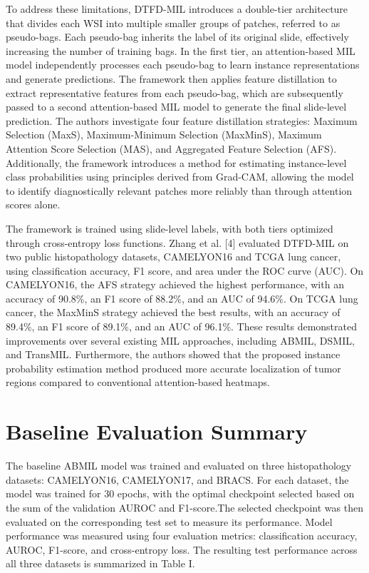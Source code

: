\documentclass[journal]{IEEEtran}
\begin{document}
To address these limitations, DTFD-MIL introduces a double-tier architecture that divides each WSI into multiple smaller groups of patches, referred to as pseudo-bags. Each pseudo-bag inherits the label of its original slide, effectively increasing the number of training bags. In the first tier, an attention-based MIL model independently processes each pseudo-bag to learn instance representations and generate predictions. The framework then applies feature distillation to extract representative features from each pseudo-bag, which are subsequently passed to a second attention-based MIL model to generate the final slide-level prediction. The authors investigate four feature distillation strategies: Maximum Selection (MaxS), Maximum-Minimum Selection (MaxMinS), Maximum Attention Score Selection (MAS), and Aggregated Feature Selection (AFS). Additionally, the framework introduces a method for estimating instance-level class probabilities using principles derived from Grad-CAM, allowing the model to identify diagnostically relevant patches more reliably than through attention scores alone.

The framework is trained using slide-level labels, with both tiers optimized through cross-entropy loss functions. Zhang et al. [4] evaluated DTFD-MIL on two public histopathology datasets, CAMELYON16 and TCGA lung cancer, using classification accuracy, F1 score, and area under the ROC curve (AUC). On CAMELYON16, the AFS strategy achieved the highest performance, with an accuracy of 90.8\%, an F1 score of 88.2\%, and an AUC of 94.6\%. On TCGA lung cancer, the MaxMinS strategy achieved the best results, with an accuracy of 89.4\%, an F1 score of 89.1\%, and an AUC of 96.1\%. These results demonstrated improvements over several existing MIL approaches, including ABMIL, DSMIL, and TransMIL. Furthermore, the authors showed that the proposed instance probability estimation method produced more accurate localization of tumor regions compared to conventional attention-based heatmaps.

\section{Baseline Evaluation Summary}

The baseline ABMIL model was trained and evaluated on three histopathology datasets: CAMELYON16, CAMELYON17, and BRACS. For each dataset, the model was trained for 30 epochs, with the optimal checkpoint selected based on the sum of the validation AUROC and F1-score.The selected checkpoint was then evaluated on the corresponding test set to measure its performance. Model performance was measured using four evaluation metrics: classification accuracy, AUROC, F1-score, and cross-entropy loss. The resulting test performance across all three datasets is summarized in Table I. 
\end{document}
